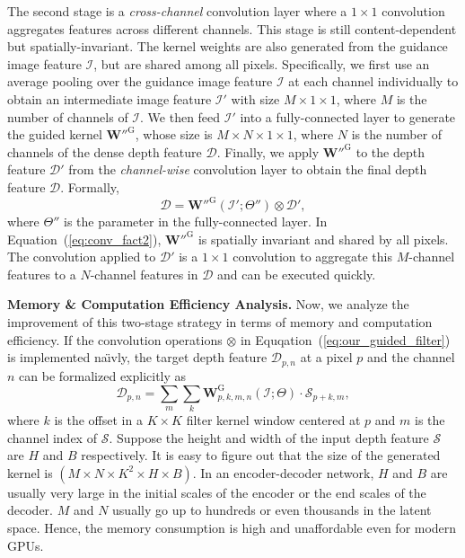 \documentclass[journal]{IEEEtran}
\begin{document}
The second stage is a \emph{cross-channel} convolution layer where a $1 \times 1$ convolution aggregates features across different channels.
This stage is still content-dependent but spatially-invariant.
The kernel weights are also generated from the guidance image feature $\mathcal{I}$, but are shared among all pixels.
Specifically, we first use an average pooling over the guidance image feature $\mathcal{I}$ at each channel individually
to obtain an intermediate image feature $\mathcal{I}'$ with size $M \times 1 \times 1$, where $M$ is the number of channels of  $\mathcal{I}$.
We then feed $\mathcal{I}'$ into a fully-connected layer to generate the guided kernel $\mathbf{W''}^{\mathrm{G}}$, whose size is $M \times N \times 1 \times 1$, where $N$ is the number of channels of the dense depth feature $\mathcal{D}$.
Finally, we apply $\mathbf{W''}^{\mathrm{G}}$ to the depth feature $\mathcal{D}'$ from the \emph{channel-wise} convolution layer to obtain the final depth feature  $\mathcal{D}$. Formally, 
\begin{equation}
\label{eq:conv_fact2}
   \mathcal{D} = \mathbf{W''}^{\mathrm{G}}(\mathcal{I'};\Theta'' ) \otimes \mathcal{D'}, 
\end{equation}
where $\Theta''$ is the parameter in the fully-connected layer.
In Equation~(\ref{eq:conv_fact2}), $\mathbf{W''}^{\mathrm{G}}$ is spatially invariant and shared by all pixels.
The convolution applied to $\mathcal{D'}$ is a $1 \times 1$ convolution to aggregate this $M$-channel features to a $N$-channel features in $\mathcal{D}$ and can be executed quickly.

\textbf{Memory \& Computation Efficiency Analysis.}
Now, we analyze the improvement of this two-stage strategy in terms of memory and computation efficiency. 
If the convolution operations $\otimes$ in Equqation~(\ref{eq:our_guided_filter}) is implemented na\"{\i}vly,
the target depth feature $\mathcal{D}_{p,n}$ at a pixel $p$ and the channel $n$ can be formalized explicitly as 
\begin{equation}
\label{eq:standard_conv}
   \mathcal{D}_{p,n} = \sum_{m}\sum_{k}\mathbf{W}_{p,k,m,n}^{\mathrm{G}}(\mathcal{I};\Theta)\cdot \mathcal{S}_{p+k,m}, 
\end{equation}
where $k$ is the offset in a $K \times K$ filter kernel window centered at $p$ and $m$ is the channel index of $\mathcal{S}$.
Suppose the height and width of the input depth feature $\mathcal{S}$ are $H$ and $B$ respectively.
It is easy to figure out that the size of the generated kernel is $(M \times N \times K^2 \times H \times B)$.
In an encoder-decoder network, $H$ and $B$ are usually very large in the initial scales of  the encoder or the end scales of the decoder.
$M$ and $N$ usually go up to hundreds or even thousands in the latent space. Hence, the memory consumption is high and unaffordable even for modern GPUs. 
\end{document}
